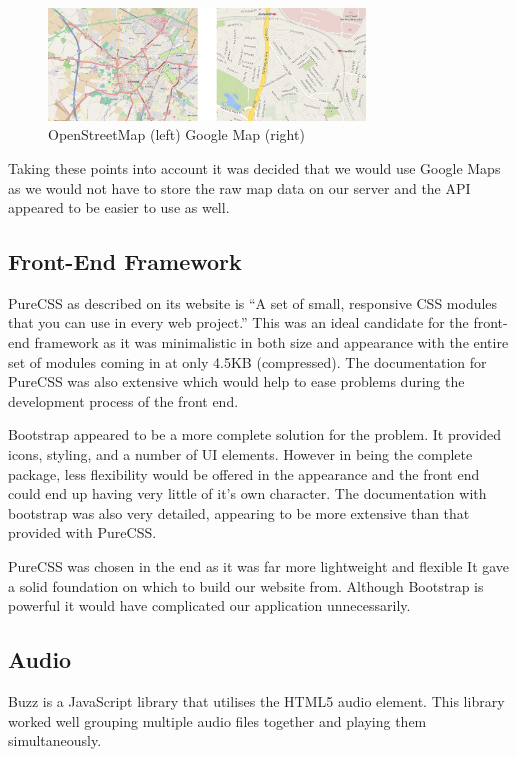 \documentclass{l3proj}
\begin{document}
\begin{figure}[ht!]
  \centering
\includegraphics[width=0.75\textwidth]{images/openstreetmap_google-map.jpg}
\caption{OpenStreetMap (left) Google Map (right)}
\end{figure}

Taking these points into account it was decided that we would use Google Maps as we would not have to store the raw map data on our server and the API appeared to be easier to use as well.
 

\subsection{Front-End Framework}

PureCSS as described on its website is “A set of small, responsive CSS modules that you can use in every web project.” This was an ideal candidate for the front-end framework as it was minimalistic in both size and appearance with the entire set of modules coming in at only 4.5KB (compressed). The documentation for PureCSS was also extensive which would help to ease problems during the development process of the front end.

Bootstrap appeared to be a more complete solution for the problem. It provided icons, styling, and a number of UI elements. However in being the complete package, less flexibility would be offered in the appearance and the front end could end up having very little of it’s own character. The documentation with bootstrap was also very detailed, appearing to be more extensive than that provided with PureCSS.

PureCSS was chosen in the end as it was far more lightweight and flexible It gave a solid foundation on which to build our website from. Although Bootstrap is powerful it would have complicated our application unnecessarily.
 

\subsection{Audio}

Buzz is a JavaScript library that utilises the HTML5 audio element. This library worked well grouping multiple audio files together and playing them simultaneously.
\end{document}
